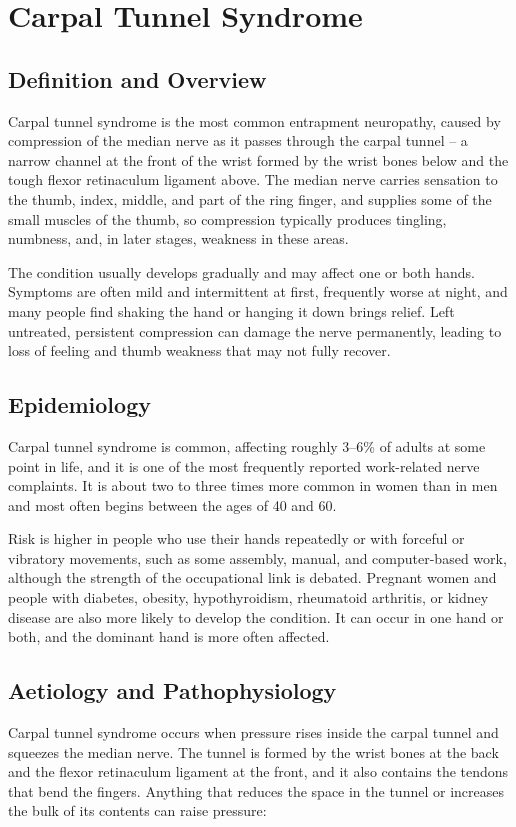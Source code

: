 \chapter{Carpal Tunnel Syndrome}

\section*{Definition and Overview}
Carpal tunnel syndrome is the most common entrapment neuropathy, caused by compression of the median nerve as it passes through the carpal tunnel -- a narrow channel at the front of the wrist formed by the wrist bones below and the tough flexor retinaculum ligament above. The median nerve carries sensation to the thumb, index, middle, and part of the ring finger, and supplies some of the small muscles of the thumb, so compression typically produces tingling, numbness, and, in later stages, weakness in these areas.

The condition usually develops gradually and may affect one or both hands. Symptoms are often mild and intermittent at first, frequently worse at night, and many people find shaking the hand or hanging it down brings relief. Left untreated, persistent compression can damage the nerve permanently, leading to loss of feeling and thumb weakness that may not fully recover.

\section*{Epidemiology}
Carpal tunnel syndrome is common, affecting roughly 3--6\% of adults at some point in life, and it is one of the most frequently reported work-related nerve complaints. It is about two to three times more common in women than in men and most often begins between the ages of 40 and 60.

Risk is higher in people who use their hands repeatedly or with forceful or vibratory movements, such as some assembly, manual, and computer-based work, although the strength of the occupational link is debated. Pregnant women and people with diabetes, obesity, hypothyroidism, rheumatoid arthritis, or kidney disease are also more likely to develop the condition. It can occur in one hand or both, and the dominant hand is more often affected.

\section*{Aetiology and Pathophysiology}
Carpal tunnel syndrome occurs when pressure rises inside the carpal tunnel and squeezes the median nerve. The tunnel is formed by the wrist bones at the back and the flexor retinaculum ligament at the front, and it also contains the tendons that bend the fingers. Anything that reduces the space in the tunnel or increases the bulk of its contents can raise pressure:

